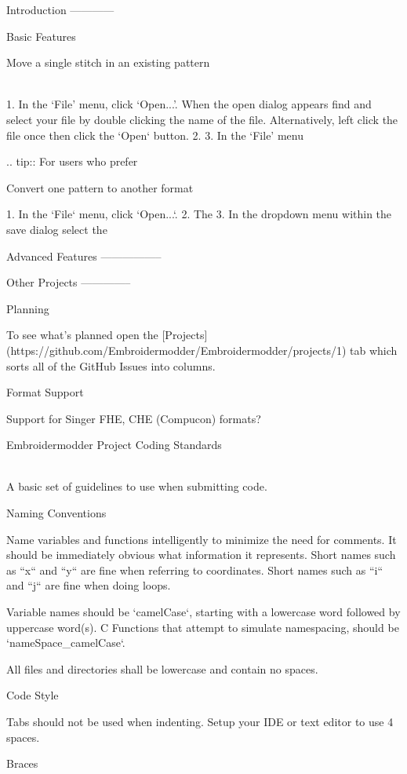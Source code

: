 \documentclass[a4paper]{report}
\begin{document}
{Introduction
------------

Basic Features
~~~~~~~~~~~~~~

Move a single stitch in an existing pattern
~~~~~~~~~~~~~~~~~~~~~~~~~~~~~~~~~~~~~~~~~~~

1. In the `File' menu, click `Open...'. When the open dialog appears find
  and select your file by double clicking the name of the file. Alternatively,
  left click the file once then click the `Open` button.
2.
3. In the `File' menu

.. tip::
   For users who prefer

Convert one pattern to another format
~~~~~~~~~~~~~~~~~~~~~~~~~~~~~~~~~~~~~

1. In the `File` menu, click `Open...`.
2. The 
3. In the dropdown menu within the save dialog select the 

Advanced Features
-----------------

Other Projects
--------------


Planning
~~~~~~~~

To see what's planned open the [Projects](https://github.com/Embroidermodder/Embroidermodder/projects/1) tab which sorts all of the GitHub Issues into columns.

Format Support
~~~~~~~~~~~~~~

Support for Singer FHE, CHE (Compucon) formats?

Embroidermodder Project Coding Standards
~~~~~~~~~~~~~~~~~~~~~~~~~~~~~~~~~~~~~~~~

A basic set of guidelines to use when submitting code.

Naming Conventions
~~~~~~~~~~~~~~~~~~

Name variables and functions intelligently to minimize the need for comments.
It should be immediately obvious what information it represents.
Short names such as ``x`` and ``y`` are fine when referring to coordinates.
Short names such as ``i`` and ``j`` are fine when doing loops.

Variable names should be `camelCase`, starting with a lowercase word followed by uppercase word(s).
C Functions that attempt to simulate namespacing, should be `nameSpace_camelCase`.

All files and directories shall be lowercase and contain no spaces.

Code Style
~~~~~~~~~~

Tabs should not be used when indenting. Setup your IDE or text editor to use 4 spaces.

Braces
~~~~~~

}
\end{document}
